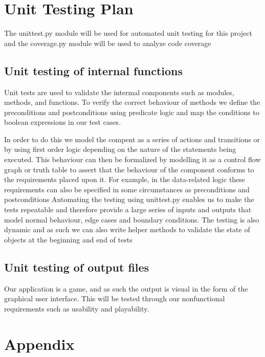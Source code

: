\documentclass[12pt, titlepage]{article}
\begin{document}
	
	\section{Unit Testing Plan}
	The unittest.py module will be used for automated unit testing for this
	project and the coverage.py module will be used to analyze code coverage

	\subsection{Unit testing of internal functions}
	Unit tests are used to validate the intermal components such as modules, 
	methods, and functions. To verify the correct behaviour of methods we
	define the preconditions and postconditions using predicate logic and map
	the conditions to boolean expressions in our test cases.

	In order to do this we model the compent as a series of
	actions and transitions or by using first order logic depending on the nature of
	the statements being executed. This behaviour can then be formalized by
	modelling it as a control flow graph or truth table to assert that the
	behaviour of the component conforms to the requirements placed upon it.
	For example, in the data-related logic these requirements can also be
	specified in some circumstances as preconditions and postconditions \newline
	Automating the testing using unittest.py enables us to make the tests
	repeatable and therefore provide a large series of inputs and outputs that
	model normal behaviour, edge cases and boundary conditions. The testing is also
	dynamic and as such we can also write helper methods to validate the state of
	objects at the beginning and end of tests
	
	\subsection{Unit testing of output files}	
	Our application is a game, and as such the output is visual in the form of the
	graphical user interface. This will be tested through our nonfunctional
	requirements such as usability and playability.

	
	
	\newpage
	\section{Appendix}
\end{document}
